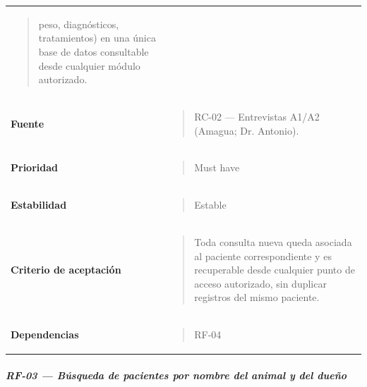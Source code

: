 \documentclass[
]{article}
\begin{document}
{\begin{longtable}[]{@{}
  >{\raggedright\arraybackslash}p{}
  >{\raggedright\arraybackslash}p{}@{}}
\begin{minipage}[t]{\linewidth}
\begin{quote}
peso, diagnósticos, tratamientos) en una única base de datos consultable
desde cualquier módulo autorizado.
\end{quote}
\end{minipage} \\
\textbf{Fuente} & \begin{minipage}[t]{\linewidth}\raggedright
\begin{quote}
RC-02 --- Entrevistas A1/A2 (Amagua; Dr. Antonio).
\end{quote}
\end{minipage} \\
\textbf{Prioridad} & \begin{minipage}[t]{\linewidth}\raggedright
\begin{quote}
Must have
\end{quote}
\end{minipage} \\
\textbf{Estabilidad} & \begin{minipage}[t]{\linewidth}\raggedright
\begin{quote}
Estable
\end{quote}
\end{minipage} \\
\textbf{Criterio de aceptación} &
\begin{minipage}[t]{\linewidth}\raggedright
\begin{quote}
Toda consulta nueva queda asociada al paciente correspondiente y es
recuperable desde cualquier punto de acceso autorizado, sin duplicar
registros del mismo paciente.
\end{quote}
\end{minipage} \\
\textbf{Dependencias} & \begin{minipage}[t]{\linewidth}\raggedright
\begin{quote}
RF-04
\end{quote}
\end{minipage} \\
\end{longtable}
}

\subparagraph{RF-03 --- Búsqueda de pacientes por nombre del animal y
del
dueño}\label{rf-03-buxfasqueda-de-pacientes-por-nombre-del-animal-y-del-dueuxf1o}
\end{document}
